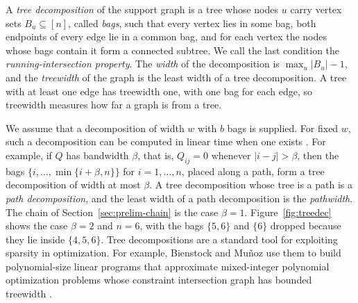 A \emph{tree decomposition} of the support graph is a tree whose nodes
$u$ carry vertex sets $B_u\subseteq[n]$, called \emph{bags}, such that
every vertex lies in some bag, both endpoints of every edge lie in a
common bag, and for each vertex the nodes whose bags contain it form a
connected subtree. We call the last condition the
\emph{running-intersection property}. The \emph{width} of the
decomposition is $\max_u|B_u|-1$, and the \emph{treewidth} of the graph
is the least width of a tree decomposition. A tree with at least one edge
has treewidth one, with one bag for each edge, so treewidth measures how
far a graph is from a tree.

We assume that a decomposition of width $w$ with $b$ bags is supplied.
For fixed $w$, such a decomposition can be computed in linear time when
one exists \cite{Bodlaender}. For example, if $Q$ has bandwidth $\beta$,
that is, $Q_{ij}=0$ whenever $|i-j|>\beta$, then the bags
$\{i,\ldots,\min\{i+\beta,n\}\}$ for $i=1,\ldots,n$, placed along a path,
form a tree decomposition of width at most $\beta$. A tree decomposition
whose tree is a path is a \emph{path decomposition}, and the least width
of a path decomposition is the \emph{pathwidth}. The chain of
Section~\ref{sec:prelim-chain} is the case $\beta=1$.
Figure~\ref{fig:treedec} shows the case $\beta=2$ and $n=6$, with the
bags $\{5,6\}$ and $\{6\}$ dropped because they lie inside $\{4,5,6\}$.
Tree decompositions are a standard tool for exploiting sparsity in
optimization. For example, Bienstock and Mu\~noz use them to build
polynomial-size linear programs that approximate mixed-integer polynomial
optimization problems whose constraint intersection graph has bounded
treewidth \cite{BienstockMunoz}.

